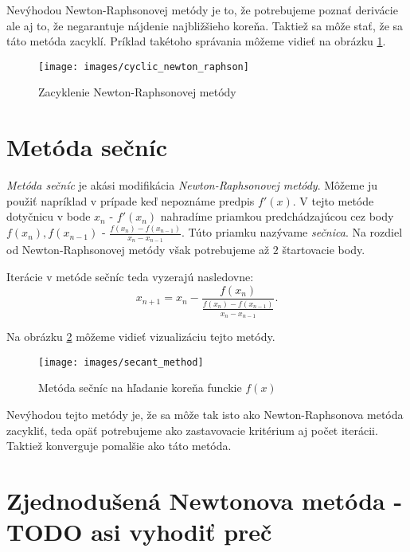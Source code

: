 Nevýhodou Newton-Raphsonovej metódy je to, že potrebujeme poznať derivácie ale aj to, že negarantuje nájdenie
najbližšieho koreňa. Taktiež sa môže stať, že sa táto metóda zacyklí. Príklad takétoho správania môžeme vidieť
na obrázku \ref{obr:cyclic_newton_raphson}.

\begin{figure}
    \centerline{\texttt{[image: images/cyclic\_newton\_raphson]}}
    \caption[Zacyklenie Newton-Raphsonovej metódy]{Zacyklenie Newton-Raphsonovej metódy}
    \label{obr:cyclic_newton_raphson}
\end{figure}

\section{Metóda sečníc}

\textit{Metóda sečníc} je akási modifikácia \textit{Newton-Raphsonovej metódy}. 
Môžeme ju použiť napríklad v prípade keď nepoznáme predpis $f'(x)$. 
V tejto metóde dotyčnicu v bode $x_n$ - $f'(x_n)$ nahradíme priamkou 
predchádzajúcou cez body $f(x_n), f(x_{n-1})$ - $\frac{f(x_n) - f(x_{n-1})}{x_n - x_{n-1}}$. 
Túto priamku nazývame \textit{sečnica}. 
Na rozdiel od Newton-Raphsonovej metódy však potrebujeme až $2$ štartovacie body.

Iterácie v metóde sečníc teda vyzerajú nasledovne:
$$ x_{n+1} = x_n - \frac{f(x_n)}{\frac{f(x_n) - f(x_{n-1})}{x_n - x_{n-1}}}.$$

Na obrázku \ref{obr:secant_method} môžeme vidieť vizualizáciu tejto metódy.

\begin{figure}
    \centerline{\texttt{[image: images/secant\_method]}}
    \caption[Metóda sečníc na hľadanie koreňa funckie $f(x)$]{Metóda sečníc na hľadanie koreňa funckie $f(x)$}
    \label{obr:secant_method}
\end{figure}

Nevýhodou tejto metódy je, že sa môže tak isto ako Newton-Raphsonova metóda zacykliť, teda 
opäť potrebujeme ako zastavovacie kritérium aj počet iterácii. Taktiež konverguje
pomalšie ako táto metóda.

\section{Zjednodušená Newtonova metóda - TODO asi vyhodiť preč}

